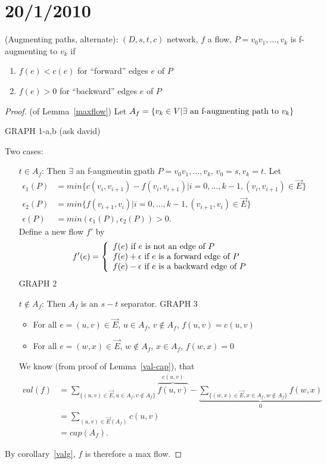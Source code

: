 \documentclass{article}
\begin{document}
\section*{20/1/2010}
\begin{defn}
(Augmenting paths, alternate): $(D,s,t,c)$ network, $f$ a flow, $P=v_0v_1,\ldots,v_k$ is f-augmenting to $v_k$ if 
\begin{enumerate}
 \item $f(e) <c(e)$ for ``forward'' edges $e$ of $P$
\item $f(e) >0$ for ``backward'' edges $e$ of $P$
\end{enumerate}
\end{defn}

\begin{proof}
(of Lemma~\ref{maxflow}) Let $A_f = \{v_k \in V | \exists \textmd{ an f-augmenting path to }v_k\}$

GRAPH 1-a,b (ask david)

Two cases:
\begin{enumerate}
 \item[$t\in A_f$:] Then $\exists$ an f-augmentin gpath $P=v_0v_1,\ldots,v_k$, $v_0=s, v_k=t$.  Let 
\begin{align*}
\epsilon_1(P)&=min\{c(v_i,v_{i+1}) - f(v_i,v_{i+1})| i=0,\ldots,k-1, (v_i, v_{i+1}) \in \overrightarrow{E}\} \\ \epsilon_2(P) &= min\{f(v_{i+1},v_i) | i=0,\ldots,k-1, (v_{i+1},v_i) \in \overrightarrow{E}\}\\ \epsilon(P) &= min (\epsilon_1(P), \epsilon_2(P)) >0.
\end{align*}  Define a new flow $f'$ by
\[f'(e) = \left\{
\begin{array}{l}
f(e) \textmd{ if $e$ is not an edge of $P$} \\
f(e) + \epsilon \textmd{ if $e$ is a forward edge of $P$} \\
f(e) - \epsilon \textmd{ if $e$ is a backward edge of $P$}
\end{array} \right. \]
GRAPH 2
\item[ $ t \notin A_f$:] Then $A_f$ is an $s-t$ separator.
GRAPH 3
\begin{itemize}
 \item For all $e = (u,v) \in \overrightarrow{E}$, $u \in A_f$, $v \notin A_f$, $f(u,v)=c(u,v)$
\item For all $e = (w,x) \in \overrightarrow{E}$, $w \notin A_f$, $x \in A_f$, $f(w,x)=0$
\end{itemize}
We know (from proof of Lemma~\ref{val-cap}), that
\begin{align*}
val(f) &= \displaystyle\sum_{\{(u,v) \in \overrightarrow{E}, u \in A_f, v \notin A_f\}} \overbrace{f(u,v)}^{c(u,v)} - \underbrace{\sum_{\{(w,x) \in \overrightarrow{E}, x \in A_f, w \notin A_f\}} f(w,x)}_{0} \\ 
&= \sum_{(u,v) \in \overrightarrow{E}(A_f)} c(u,v) \\
 &= cap(A_f).
\end{align*}  
\end{enumerate}
By corollary~\ref{valg}, $f$ is therefore a max flow.
\end{proof}
\end{document}
